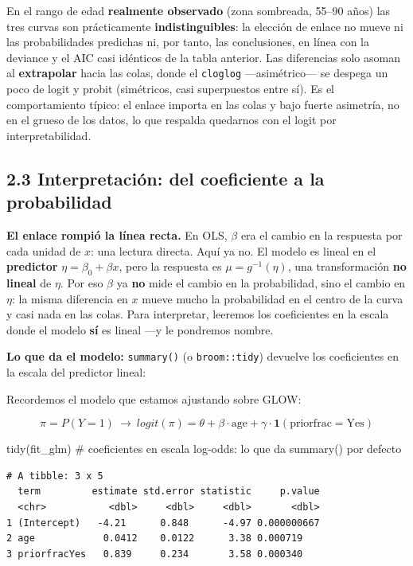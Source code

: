 \documentclass[
  letterpaper,
  DIV=11,
  numbers=noendperiod]{scrartcl}
\newenvironment{Shaded}{\begin{snugshade}}{\end{snugshade}}
\newcommand{\CommentTok}[1]{\textcolor[rgb]{0.37,0.37,0.37}{#1}}
\newcommand{\FunctionTok}[1]{\textcolor[rgb]{0.28,0.35,0.67}{#1}}
\newcommand{\NormalTok}[1]{\textcolor[rgb]{0.00,0.23,0.31}{#1}}
\begin{document}
En el rango de edad \textbf{realmente observado} (zona sombreada, 55--90
años) las tres curvas son prácticamente \textbf{indistinguibles}: la
elección de enlace no mueve ni las probabilidades predichas ni, por
tanto, las conclusiones, en línea con la deviance y el AIC casi
idénticos de la tabla anterior. Las diferencias solo asoman al
\textbf{extrapolar} hacia las colas, donde el \texttt{cloglog}
---asimétrico--- se despega un poco de logit y probit (simétricos, casi
superpuestos entre sí). Es el comportamiento típico: el enlace importa
en las colas y bajo fuerte asimetría, no en el grueso de los datos, lo
que respalda quedarnos con el logit por interpretabilidad.

\hypertarget{sec-u12-interpretacion}{%
\subsection{2.3 Interpretación: del coeficiente a la
probabilidad}\label{sec-u12-interpretacion}}

\textbf{El enlace rompió la línea recta.} En OLS, \(\beta\) era el
cambio en la respuesta por cada unidad de \(x\): una lectura directa.
Aquí ya no. El modelo es lineal en el \textbf{predictor}
\(\eta=\beta_0+\beta x\), pero la respuesta es \(\mu=g^{-1}(\eta)\), una
transformación \textbf{no lineal} de \(\eta\). Por eso \(\beta\) ya
\textbf{no} mide el cambio en la probabilidad, sino el cambio en
\(\eta\): la misma diferencia en \(x\) mueve mucho la probabilidad en el
centro de la curva y casi nada en las colas. Para interpretar, leeremos
los coeficientes en la escala donde el modelo \textbf{sí} es lineal ---y
le pondremos nombre.

\textbf{Lo que da el modelo:} \texttt{summary()} (o
\texttt{broom::tidy}) devuelve los coeficientes en la escala del
predictor lineal:

Recordemos el modelo que estamos ajustando sobre GLOW:

\[\pi = P(Y=1) \ \rightarrow \ logit(\pi)=\theta + \beta \cdot \text{age} + \gamma \cdot \mathbf{1}(\text{priorfrac}=\text{Yes})\]

\begin{Shaded}
\begin{Highlighting}[]
\FunctionTok{tidy}\NormalTok{(fit\_glm)   }\CommentTok{\# coeficientes en escala log{-}odds: lo que da summary() por defecto}
\end{Highlighting}
\end{Shaded}

\begin{verbatim}
# A tibble: 3 x 5
  term         estimate std.error statistic     p.value
  <chr>           <dbl>     <dbl>     <dbl>       <dbl>
1 (Intercept)   -4.21      0.848      -4.97 0.000000667
2 age            0.0412    0.0122      3.38 0.000719   
3 priorfracYes   0.839     0.234       3.58 0.000340   
\end{verbatim}
\end{document}
